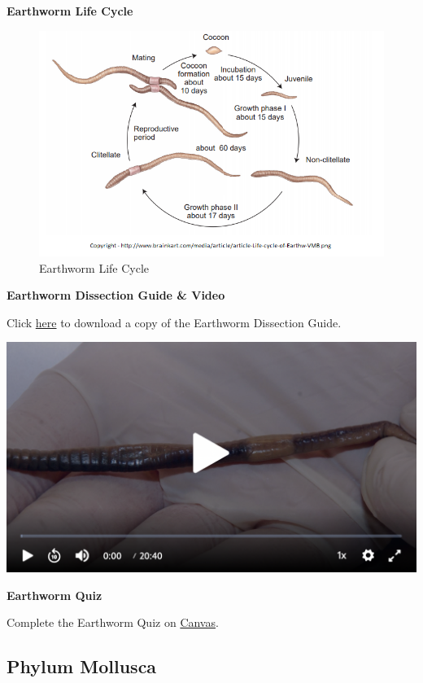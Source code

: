 \documentclass[
]{book}
\begin{document}
\textbf{Earthworm Life Cycle}

\begin{figure}
\centering
\includegraphics{images/Lab4_earthworm_life_cycle.png}
\caption{Earthworm Life Cycle}
\end{figure}

\textbf{Earthworm Dissection Guide \& Video}

Click \href{files/Lab4_earthworm_dissection_guide.pdf}{here} to download a copy of the Earthworm Dissection Guide.

\includegraphics{images/Lab4_Earthworm_Dissection_Video.png}

\textbf{Earthworm Quiz}

Complete the Earthworm Quiz on \href{https://canvas.ubc.ca/}{Canvas}.

\hypertarget{phylum-mollusca-1}{%
\subsection*{Phylum Mollusca}\label{phylum-mollusca-1}}
\end{document}

